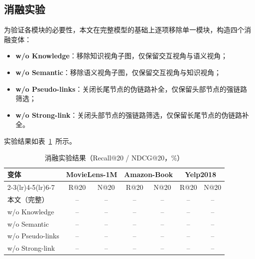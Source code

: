 
\subsection{消融实验}
\label{subsec:graph-ablation}

为验证各模块的必要性，本文在完整模型的基础上逐项移除单一模块，构造四个消融变体：

\begin{itemize}
  \item \textbf{w/o Knowledge}：移除知识视角子图，仅保留交互视角与语义视角；
  \item \textbf{w/o Semantic}：移除语义视角子图，仅保留交互视角与知识视角；
  \item \textbf{w/o Pseudo-links}：关闭长尾节点的伪链路补全，仅保留头部节点的强链路筛选；
  \item \textbf{w/o Strong-link}：关闭头部节点的强链路筛选，仅保留长尾节点的伪链路补全。
\end{itemize}

实验结果如表~\ref{tab:graph-ablation}~所示。

\begin{table}[htbp]
  \centering
  \caption{消融实验结果（Recall@20 / NDCG@20，\%）}
  \label{tab:graph-ablation}
  \begin{tabular}{lcccccc}
    \toprule
    \multirow{2}{*}{变体} & \multicolumn{2}{c}{MovieLens-1M} & \multicolumn{2}{c}{Amazon-Book} & \multicolumn{2}{c}{Yelp2018} \\
    \cmidrule(lr){2-3}\cmidrule(lr){4-5}\cmidrule(lr){6-7}
     & R@20 & N@20 & R@20 & N@20 & R@20 & N@20 \\
    \midrule
    本文（完整）      & -- & -- & -- & -- & -- & -- \\
    w/o Knowledge     & -- & -- & -- & -- & -- & -- \\
    w/o Semantic      & -- & -- & -- & -- & -- & -- \\
    w/o Pseudo-links  & -- & -- & -- & -- & -- & -- \\
    w/o Strong-link   & -- & -- & -- & -- & -- & -- \\
    \bottomrule
  \end{tabular}
\end{table}

